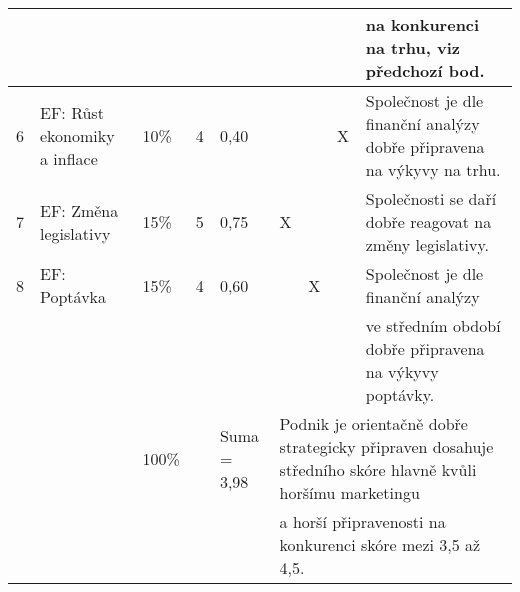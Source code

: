 \begin{table}[]
{{\begin{tabular}{|l|l|l|l|l|llll|}
 &  &  &  &  & \multicolumn{1}{l|}{} & \multicolumn{1}{l|}{} & \multicolumn{1}{l|}{} & na konkurenci na trhu, viz předchozí bod. \\ \hline
6 & EF: Růst ekonomiky a inflace & 10\% & 4 & 0,40 & \multicolumn{1}{l|}{} & \multicolumn{1}{l|}{} & \multicolumn{1}{l|}{X} & Společnost je dle finanční analýzy dobře připravena na výkyvy na trhu. \\ \hline
7 & EF: Změna legislativy & 15\% & 5 & 0,75 & \multicolumn{1}{l|}{X} & \multicolumn{1}{l|}{} & \multicolumn{1}{l|}{} & Společnosti se daří dobře reagovat na změny legislativy. \\ \hline
8 & EF: Poptávka & 15\% & 4 & 0,60 & \multicolumn{1}{l|}{} & \multicolumn{1}{l|}{X} & \multicolumn{1}{l|}{} & Společnost je dle finanční analýzy \\
 &  &  &  &  & \multicolumn{1}{l|}{} & \multicolumn{1}{l|}{} & \multicolumn{1}{l|}{} & ve středním období dobře připravena na výkyvy poptávky. \\ \hline
\cellcolor[HTML]{C0C0C0} & \cellcolor[HTML]{C0C0C0} & 100\% & \cellcolor[HTML]{C0C0C0} & Suma = 3,98 & \multicolumn{4}{l|}{Podnik je orientačně dobře strategicky připraven dosahuje středního skóre hlavně kvůli horšímu marketingu} \\
\cellcolor[HTML]{C0C0C0} & \cellcolor[HTML]{C0C0C0} &  & \cellcolor[HTML]{C0C0C0} &  & \multicolumn{4}{l|}{a horší připravenosti na konkurenci skóre mezi 3,5 až 4,5.} \\ \hline
\end{tabular}
}
}
\end{table}